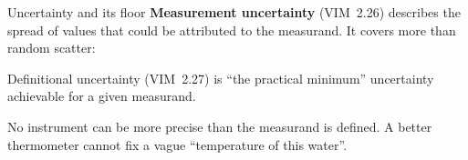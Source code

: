 \documentclass[aspectratio=169,11pt]{beamer}
\begin{document}
\begin{frame}[label=uncertainty]{Uncertainty and its floor}
\textbf{Measurement uncertainty} (VIM~2.26) describes the spread of values that could be attributed to the measurand. It covers more than random scatter:

\vspace{0.4em}
\begin{center}
\end{center}

\vspace{0.4em}
Definitional uncertainty (VIM~2.27) is ``the practical minimum'' uncertainty achievable for a given measurand.

\vspace{0.2em}
{\small No instrument can be more precise than the measurand is defined. A better thermometer cannot fix a vague ``temperature of this water''.}
\end{frame}
\end{document}
